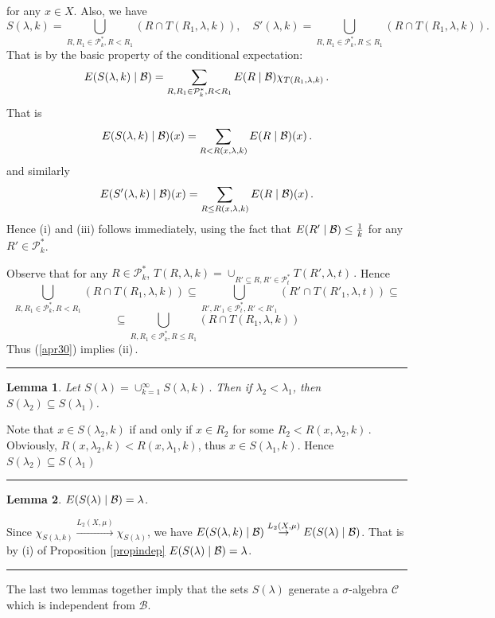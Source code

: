\documentclass [11pt] {article}
\newcommand{\qed} {\hspace {0.1in} \rule {1.5mm} {3.5mm}}
\newtheorem{lemma}{Lemma}[section]
\def\proof{\smallskip\noindent{\it Proof.} }
\def\cB{\mbox{$\cal B$}}
\def\cB{\mbox{$\cal B$}}
\def\to{\rightarrow}
\begin{document}
for any $x\in X$. Also, we have
\begin{equation} \label{apr30}
S(\lambda,k)=\bigcup_{R,R_1\in \mathcal{P}_k^*, R<R_1}
(R\cap T(R_1,\lambda,k)),\quad
S'(\lambda,k)=\bigcup_{R,R_1\in \mathcal{P}_k^*, R\leq R_1}
(R\cap T(R_1,\lambda,k)). \end{equation}
That is by the basic property of the conditional expectation:
$$E(S(\lambda,k)\mid \cB)=
\sum_{R,R_1\in \mathcal{P}_k^*, R<R_1} E(R\mid \cB)
\chi_{T(R_1,\lambda,k)}\,.$$
That is
\begin{equation} \label{egy5}
E(S(\lambda,k)\mid \cB)(x)=\sum_{R<R(x,\lambda,k)}  E(R\mid \cB)(x)\,.
\end{equation}
and similarly
\begin{equation} \label{egy5b}
E(S'(\lambda,k)\mid \cB)(x)=\sum_{R\leq R(x,\lambda,k)}  E(R\mid \cB)(x)\,.
\end{equation}
Hence (i) and (iii) follows immediately, using the fact that
$E(R'\mid\cB)\leq \frac{1}{k}$ for any $R'\in \mathcal{P}_k^*$.

\noindent
Observe that for any $R\in \mathcal{P}_k^*$,
$T(R,\lambda,k)=\cup_{R'\subseteq R, R'\in \mathcal{P}_t^*}
T(R',\lambda,t)\,.$
Hence
$$\bigcup_{R,R_1\in \mathcal{P}_k^*, R<R_1}
(R\cap T(R_1,\lambda,k)) \subseteq
\bigcup_{R',R'_1\in \mathcal{P}_t^*, R'<R'_1}
(R'\cap T(R'_1,\lambda,t)) \subseteq$$ $$\subseteq
\bigcup_{R,R_1\in \mathcal{P}_k^*, R\leq R_1}
(R\cap T(R_1,\lambda,k))$$
Thus (\ref{apr30}) implies (ii)\,.
 \qed

\vskip 0.2in
\noindent
\begin{lemma} Let $S(\lambda)=\cup^\infty_{k=1} S(\lambda,k)\,.$
 Then if $\lambda_2<\lambda_1$, then $S(\lambda_2)\subseteq S(\lambda_1)$.
\end{lemma}
\proof Note that $x\in S(\lambda_2,k)$ if and only if
$x\in R_2$ for some $R_2< R(x,\lambda_2,k)\,.$ Obviously,
$R(x,\lambda_2,k)< R(x,\lambda_1,k)$, thus $x\in S(\lambda_1,k)$. Hence
$S(\lambda_2)\subseteq S(\lambda_1)$ \qed
\begin{lemma} $E(S(\lambda)\mid \cB)=\lambda$.
\end{lemma}
\proof
Since $\chi_{S(\lambda,k)}\stackrel
{L_2(X,\mu)}{\to} \chi_{S(\lambda)}$, we have
$E(S(\lambda,k)\mid \cB)
\stackrel{L_2(X,\mu)}{\to}E(S(\lambda)\mid \cB)$. That is
by (i) of Proposition \ref{propindep} $E(S(\lambda)\mid \cB)=\lambda$. \qed
\vskip 0.2in
\noindent
The last two lemmas together imply that the sets $S(\lambda)$ generate a
$\sigma$-algebra $\mathcal{C}$ which is independent from $\mathcal{B}$.
\end{document}
